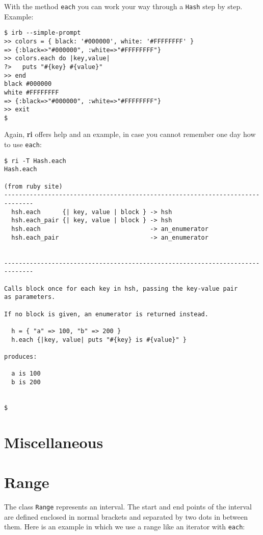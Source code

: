 \documentclass[a4paper]{book}
\begin{document}
With the method \texttt{each} you can work your way through a \texttt{Hash} step by step. Example:

\begin{shaded}\begin{verbatim}
$ irb --simple-prompt
>> colors = { black: '#000000', white: '#FFFFFFFF' }
=> {:black=>"#000000", :white=>"#FFFFFFFF"}
>> colors.each do |key,value|
?>   puts "#{key} #{value}"
>> end
black #000000
white #FFFFFFFF
=> {:black=>"#000000", :white=>"#FFFFFFFF"}
>> exit
$
\end{verbatim}\end{shaded}

Again, \textbf{ri} offers help and an example, in case you cannot remember one day how to use \texttt{each}:

\begin{shaded}\begin{verbatim}
$ ri -T Hash.each
Hash.each

(from ruby site)
------------------------------------------------------------------------------
  hsh.each      {| key, value | block } -> hsh
  hsh.each_pair {| key, value | block } -> hsh
  hsh.each                              -> an_enumerator
  hsh.each_pair                         -> an_enumerator


------------------------------------------------------------------------------

Calls block once for each key in hsh, passing the key-value pair
as parameters.

If no block is given, an enumerator is returned instead.

  h = { "a" => 100, "b" => 200 }
  h.each {|key, value| puts "#{key} is #{value}" }

produces:

  a is 100
  b is 200


$
\end{verbatim}\end{shaded}

\section{Miscellaneous}\label{miscellaneous}

\section{Range}\label{range}

The class \texttt{Range} represents an interval. The start and end points of the interval are defined enclosed in normal brackets and separated by two dots in between them. Here is an example in which we use a range like an iterator with \texttt{each}:
\end{document}
